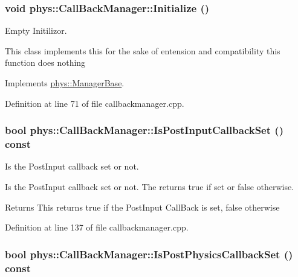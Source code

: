 \hypertarget{classphys_1_1CallBackManager_a3d2af4e3c947b14f628c3e09a96af2f9}{
\subsubsection[{Initialize}]{\setlength{\rightskip}{0pt plus 5cm}void phys::CallBackManager::Initialize ()}}
\label{d1/d47/classphys_1_1CallBackManager_a3d2af4e3c947b14f628c3e09a96af2f9}


Empty Initilizor. 

This class implements this for the sake of entension and compatibility this function does nothing 

Implements \hyperlink{classphys_1_1ManagerBase_a57dd8e54e767427d5bdcc86dc66d73ed}{phys::ManagerBase}.



Definition at line 71 of file callbackmanager.cpp.

\hypertarget{classphys_1_1CallBackManager_afa96dbc0779e5fa386546502b3db6c39}{
\subsubsection[{IsPostInputCallbackSet}]{\setlength{\rightskip}{0pt plus 5cm}bool phys::CallBackManager::IsPostInputCallbackSet () const}}
\label{d1/d47/classphys_1_1CallBackManager_afa96dbc0779e5fa386546502b3db6c39}


Is the PostInput callback set or not. 

Is the PostInput callback set or not. The returns true if set or false otherwise. \begin{DoxyReturn}{Returns}
This returns true if the PostInput CallBack is set, false otherwise 
\end{DoxyReturn}


Definition at line 137 of file callbackmanager.cpp.

\hypertarget{classphys_1_1CallBackManager_ad1e2131d792c6813caae4be4d5c4e5fb}{
\subsubsection[{IsPostPhysicsCallbackSet}]{\setlength{\rightskip}{0pt plus 5cm}bool phys::CallBackManager::IsPostPhysicsCallbackSet () const}}
\label{d1/d47/classphys_1_1CallBackManager_ad1e2131d792c6813caae4be4d5c4e5fb}


